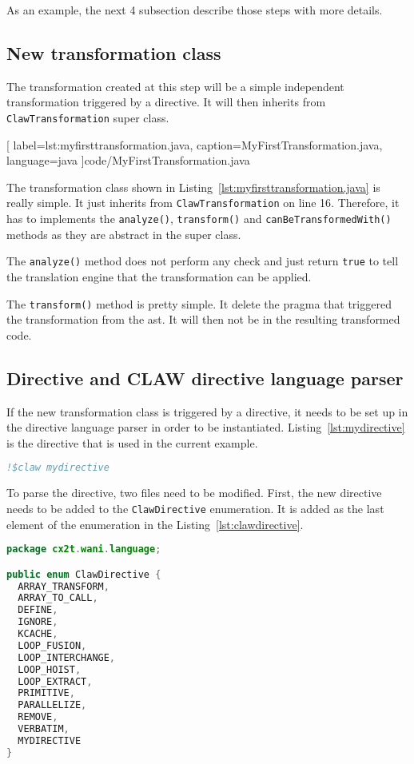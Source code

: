 As an example, the next 4 subsection describe those steps with more details.

\subsection{New transformation class}
The transformation created at this step will be a simple independent
transformation triggered by a directive. It will then inherits from 
\lstinline|ClawTransformation| super class.


  [
    label=lst:myfirsttransformation.java,
    caption=MyFirstTransformation.java,
    language=java
  ]{code/MyFirstTransformation.java}

The transformation class shown in Listing~\ref{lst:myfirsttransformation.java}
is really simple. It just inherits from \lstinline|ClawTransformation| on line
16. Therefore, it has to implements the \lstinline|analyze()|,
\lstinline|transform()| and \lstinline|canBeTransformedWith()| methods as they 
are abstract in the super class.

The \lstinline|analyze()| method does not perform any check and just return
\lstinline|true| to tell the translation engine that the transformation can 
be applied.

The \lstinline|transform()| method is pretty simple. It delete the pragma that
triggered the transformation from the \gls{ast}. It will then not be in the
resulting transformed code.

\subsection{Directive and CLAW directive language parser}
If the new transformation class is triggered by a directive, it needs to
be set up in the directive language parser in order to be instantiated. 
Listing~\ref{lst:mydirective} is the directive that is used in 
the current example.

\begin{lstlisting}[label=lst:mydirective, caption=Example directive, 
  language=fortran]
!$claw mydirective
\end{lstlisting}

To parse the directive, two files need to be modified. First, the new directive
needs to be added to the \lstinline|ClawDirective| enumeration. It is added as
the last element of the enumeration in the Listing~\ref{lst:clawdirective}.

\begin{lstlisting}[label=lst:clawdirective, caption=ClawDirective.java, 
  language=java]
package cx2t.wani.language;

public enum ClawDirective {
  ARRAY_TRANSFORM,
  ARRAY_TO_CALL,
  DEFINE,
  IGNORE,
  KCACHE,
  LOOP_FUSION,
  LOOP_INTERCHANGE,
  LOOP_HOIST,
  LOOP_EXTRACT,
  PRIMITIVE,
  PARALLELIZE,
  REMOVE,
  VERBATIM,
  MYDIRECTIVE
}
\end{lstlisting}

